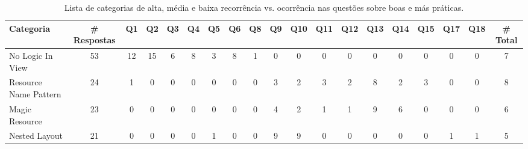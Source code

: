 \begin{table*}[t]
\centering
\caption{Lista de categorias de alta, m\'edia e baixa recorr\^encia vs. ocorr\^encia nas quest\~oes sobre boas e m\'as pr\'aticas.}
\footnotesize
\begin{tabular}{@{}lcccccccccccccccccc@{}}
\toprule
\textbf{Categoria} 	& \textbf{\# Respostas} 	& \multicolumn{1}{c}{Q1} 	& \multicolumn{1}{c}{Q2} 	& \multicolumn{1}{c}{Q3} 	& \multicolumn{1}{c}{Q4} 	& \multicolumn{1}{c}{Q5} 	& \multicolumn{1}{c}{Q6} 	& \multicolumn{1}{c}{Q8} 	& \multicolumn{1}{c}{Q9} 	& \multicolumn{1}{c}{Q10} 	& \multicolumn{1}{c}{Q11} 	& \multicolumn{1}{c}{Q12} 	& \multicolumn{1}{c}{Q13} 	& \multicolumn{1}{c}{Q14} 	& \multicolumn{1}{c}{Q15} 	& \multicolumn{1}{c}{Q17} 	& \multicolumn{1}{c}{Q18} 	&  \textbf{\# Total} \\
\hline
No Logic In View								& 	\multicolumn{1}{c}{53} 	& \multicolumn{1}{c}{12} 	& \multicolumn{1}{c}{15} 	& \multicolumn{1}{c}{6} 	& \multicolumn{1}{c}{8} 	& \multicolumn{1}{c}{3} 	& \multicolumn{1}{c}{8} 	& \multicolumn{1}{c}{1} 	& \multicolumn{1}{c}{0} 	& \multicolumn{1}{c}{0} 	& \multicolumn{1}{c}{0} 	& \multicolumn{1}{c}{0} 	& \multicolumn{1}{c}{0} 	& \multicolumn{1}{c}{0} 	& \multicolumn{1}{c}{0} 	& \multicolumn{1}{c}{0} 	& \multicolumn{1}{c}{0} 	& \multicolumn{1}{c}{7}	\\
Resource Name Pattern							& 	\multicolumn{1}{c}{24} 	& \multicolumn{1}{c}{1} 	& \multicolumn{1}{c}{0} 	& \multicolumn{1}{c}{0} 	& \multicolumn{1}{c}{0} 	& \multicolumn{1}{c}{0} 	& \multicolumn{1}{c}{0} 	& \multicolumn{1}{c}{0} 	& \multicolumn{1}{c}{3} 	& \multicolumn{1}{c}{2} 	& \multicolumn{1}{c}{3} 	& \multicolumn{1}{c}{2} 	& \multicolumn{1}{c}{8} 	& \multicolumn{1}{c}{2} 	& \multicolumn{1}{c}{3} 	& \multicolumn{1}{c}{0} 	& \multicolumn{1}{c}{0} 	& \multicolumn{1}{c}{8}	\\
Magic Resource									& 	\multicolumn{1}{c}{23} 	& \multicolumn{1}{c}{0} 	& \multicolumn{1}{c}{0} 	& \multicolumn{1}{c}{0} 	& \multicolumn{1}{c}{0} 	& \multicolumn{1}{c}{0} 	& \multicolumn{1}{c}{0} 	& \multicolumn{1}{c}{0} 	& \multicolumn{1}{c}{4} 	& \multicolumn{1}{c}{2} 	& \multicolumn{1}{c}{1} 	& \multicolumn{1}{c}{1} 	& \multicolumn{1}{c}{9} 	& \multicolumn{1}{c}{6} 	& \multicolumn{1}{c}{0} 	& \multicolumn{1}{c}{0} 	& \multicolumn{1}{c}{0} 	& \multicolumn{1}{c}{6}	\\
Nested Layout									& 	\multicolumn{1}{c}{21} 	& \multicolumn{1}{c}{0} 	& \multicolumn{1}{c}{0} 	& \multicolumn{1}{c}{0} 	& \multicolumn{1}{c}{0} 	& \multicolumn{1}{c}{1} 	& \multicolumn{1}{c}{0} 	& \multicolumn{1}{c}{0} 	& \multicolumn{1}{c}{9} 	& \multicolumn{1}{c}{9} 	& \multicolumn{1}{c}{0} 	& \multicolumn{1}{c}{0} 	& \multicolumn{1}{c}{0} 	& \multicolumn{1}{c}{0} 	& \multicolumn{1}{c}{0} 	& \multicolumn{1}{c}{1} 	& \multicolumn{1}{c}{1} 	& \multicolumn{1}{c}{5}	\\

\end{tabular}
\end{table*}
